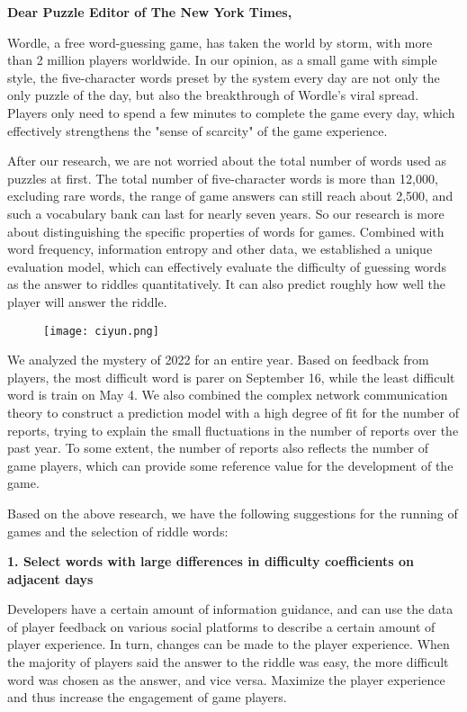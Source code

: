 \documentclass{mcmthesis}
\begin{document}
 \newpage
  \begin{memo}[Memorandum]
 \noindent
 \textbf{Dear Puzzle Editor of The New York Times,}
 
 Wordle, a free word-guessing game, has taken the world by storm, with more than 2 million players worldwide. In our opinion, as a small game with simple style, the five-character words preset by the system every day are not only the only puzzle of the day, but also the breakthrough of Wordle's viral spread. Players only need to spend a few minutes to complete the game every day, which effectively strengthens the "sense of scarcity" of the game experience.
 
 After our research, we are not worried about the total number of words used as puzzles at first. The total number of five-character words is more than 12,000, excluding rare words, the range of game answers can still reach about 2,500, and such a vocabulary bank can last for nearly seven years. So our research is more about distinguishing the specific properties of words for games. Combined with word frequency, information entropy and other data, we established a unique evaluation model, which can effectively evaluate the difficulty of guessing words as the answer to riddles quantitatively. It can also predict roughly how well the player will answer the riddle.
 \begin{figure}[H]
 	\centering
 	\texttt{[image:  ciyun.png]}
 \end{figure}

We analyzed the mystery of 2022 for an entire year. Based on feedback from players, the most difficult word is parer on September 16, while the least difficult word is train on May 4. We also combined the complex network communication theory to construct a prediction model with a high degree of fit for the number of reports, trying to explain the small fluctuations in the number of reports over the past year. To some extent, the number of reports also reflects the number of game players, which can provide some reference value for the development of the game.

 Based on the above research, we have the following suggestions for the running of games and the selection of riddle words:
 
 \textbf{1. Select words with large differences in difficulty coefficients on adjacent days}
 
 Developers have a certain amount of information guidance, and can use the data of player feedback on various social platforms to describe a certain amount of player experience. In turn, changes can be made to the player experience. When the majority of players said the answer to the riddle was easy, the more difficult word was chosen as the answer, and vice versa. Maximize the player experience and thus increase the engagement of game players.
 

\end{memo}
\end{document}
